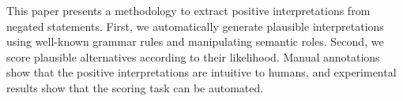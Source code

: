 This paper presents a methodology to extract positive interpretations from negated statements. First, we automatically generate plausible interpretations using well-known grammar rules and manipulating semantic roles. Second, we score plausible alternatives according to their likelihood. Manual annotations show that the positive interpretations are intuitive to humans, and experimental results show that the scoring task can be automated.
